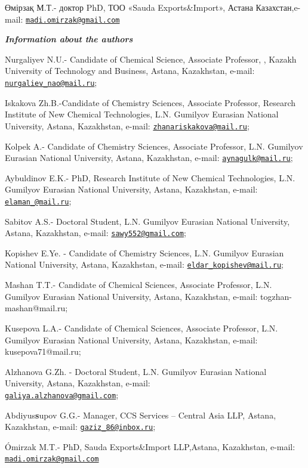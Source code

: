 \begin{authorinfo}
Өмірзақ М.Т.- доктор PhD, ТОО «Sauda Exports\&Import», Астана
Казахстан,e-mail:
\href{mailto:madi.omirzak@gmail.com}{\nolinkurl{madi.omirzak@gmail.com}}

\hspace{1em}\emph{{\bfseries Information about the authors}}

Nurgaliyev N.U.- Candidate of Chemical Science, Associate Professor, ,
Kazakh University of Technology and Business, Astana, Kazakhstan,
e-mail:
\href{mailto:nurgaliev_nao@mail.ru}{\nolinkurl{nurgaliev\_nao@mail.ru}};

Iskakova Zh.B.-Candidate of Chemistry Sciences, Associate Professor,
Research Institute of New Chemical Technologies, L.N. Gumilyov Eurasian
National University, Astana, Kazakhstan, e-mail:
\href{mailto:zhanariskakova@mail.ru}{\nolinkurl{zhanariskakova@mail.ru}};

Kolpek A.- Candidate of Chemistry Sciences, Associate Professor, L.N.
Gumilyov Eurasian National University, Astana, Kazakhstan, e-mail:
\href{mailto:aynagulk@mail.ru}{\nolinkurl{aynagulk@mail.ru}};

Aybuldinov E.K.- PhD, Research Institute of New Chemical Technologies,
L.N. Gumilyov Eurasian National University, Astana, Kazakhstan, e-mail:
\href{mailto:elaman_@mail.ru}{\nolinkurl{elaman\_@mail.ru}};

Sabitov A.S.- Doctoral Student, L.N. Gumilyov Eurasian National
University, Astana, Kazakhstan, e-mail:
\href{mailto:sawy552@gmail.com}{\nolinkurl{sawy552@gmail.com}};

Kopishev E.Ye. - Candidate of Chemistry Sciences, L.N. Gumilyov Eurasian
National University, Astana, Kazakhstan, e-mail:
\href{mailto:eldar_kopishev@mail.ru}{\nolinkurl{eldar\_kopishev@mail.ru}};

Mashan T.T.- Candidate of Chemical Sciences, Associate Professor, L.N.
Gumilyov Eurasian National University, Astana, Kazakhstan, e-mail:
togzhan-mashan@mail.ru;

Kusepova L.A.- Candidate of Chemical Sciences, Associate Professor, L.N.
Gumilyov Eurasian National University, Astana, Kazakhstan, e-mail:
kusepova71@mail.ru;

Alzhanova G.Zh. - Doctoral Student, L.N. Gumilyov Eurasian National
University, Astana, Kazakhstan, e-mail:
\\\href{mailto:galiya.alzhanova@gmail.com}{\nolinkurl{galiya.alzhanova@gmail.com}};

Abdiyus{\bfseries s}upov G.G.- Manager, CCS Services -- Central Asia LLP,
Astana, Kazakhstan, e-mail:
\href{mailto:gaziz_86@inbox.ru}{\nolinkurl{gaziz\_86@inbox.ru}};

Ómirzak M.T.- PhD, Sauda Exports\&Import LLP,Astana, Kazakhstan, e-mail:
\href{mailto:madi.omirzak@gmail.com}{\nolinkurl{madi.omirzak@gmail.com}}
\end{authorinfo}

